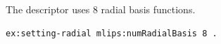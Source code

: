The descriptor uses 8 radial basis functions.
\begin{lstlisting}[language=turtle]
ex:setting-radial mlips:numRadialBasis 8 .
\end{lstlisting}
